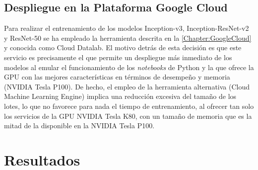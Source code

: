 \subsection{Despliegue en la Plataforma Google Cloud}

Para realizar el entrenamiento de los modelos Inception-v3, Inception-ResNet-v2 y ResNet-50 se ha empleado la herramienta descrita en la \autoref{Chapter:GoogleCloud} y conocida como Cloud Datalab. El motivo detrás de esta decisión es que este servicio es precisamente el que permite un despliegue más inmediato de los modelos al emular el funcionamiento de los \textit{notebooks} de Python y la que ofrece la GPU con las mejores características en términos de desempeño y memoria (NVIDIA Tesla P100). De hecho, el empleo de la herramienta alternativa (Cloud Machine Learning Engine) implica una reducción excesiva del tamaño de los lotes, lo que no favorece para nada el tiempo de entrenamiento, al ofrecer tan solo los servicios de la GPU NVIDIA Tesla K80, con un tamaño de memoria que es la mitad de la disponible en la NVIDIA Tesla P100.

\section{Resultados} \label{Chapter:Results}


